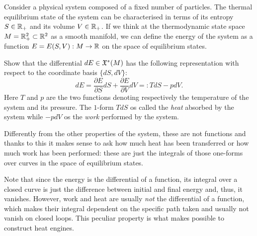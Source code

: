 \begin{exercise}
  Consider a physical system composed of a fixed number of particles.
  The thermal equilibrium state of the system can be characterised in terms of its entropy $S\in\mathbb{R}_+$ and its volume $V\in\mathbb{R}_+$.
  If we think at the thermodynamic state space $M=\mathbb{R}_+^2 \subset \mathbb{R}^2$ as a smooth manifold, we can define the energy of the system as a function $E = E(S,V): M \to\mathbb{R}$ on the space of equilibrium states.

  Show that the differential $dE\in\mathfrak{X}^*(M)$ has the following representation with respect to the coordinate basis $\{dS,dV\}$:
  \begin{equation}
    dE = \frac{\partial E}{\partial S}dS + \frac{\partial E}{\partial V} dV =: T dS - p dV.
  \end{equation}
  Here $T$ and $p$ are the two functions denoting respectively the temperature of the system and its pressure.
  The $1$-form $TdS$ os called the \emph{heat} absorbed by the system while $-p dV$ os the \emph{work} performed by the system.

  Differently from the other properties of the system, these are not functions and thanks to this it makes sense to ask how much heat has been transferred or how much work has been performed: these are just the integrals of those one-forms over curves in the space of equilibrium states.

  Note that since the energy is the differential of a function, its integral over a closed curve is just the difference between initial and final energy and, thus, it vanishes.
  However, work and heat are usually \emph{not} the differential of a function, which makes their integral dependent on the specific path taken and usually not vanish on closed loops.
  This peculiar property is what makes possible to construct heat engines.
\end{exercise}
